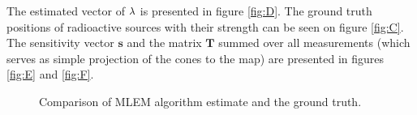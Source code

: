 {    The estimated vector of $\bf{\lambda}$ is presented in figure \ref{fig:D}. 
    The ground truth positions of radioactive sources with their strength can be seen on figure \ref{fig:C}.
    The sensitivity vector $\mathbf{s}$ and the matrix $\mathbf{T}$ summed over all measurements (which serves as simple projection of the cones to the map) are presented in figures \ref{fig:E} and \ref{fig:F}.
    \begin{figure}[!h]
      \centering
      \label{fig:A}
      \caption{Comparison of \ac{MLEM} algorithm estimate and the ground truth.}
    \end{figure}

}

